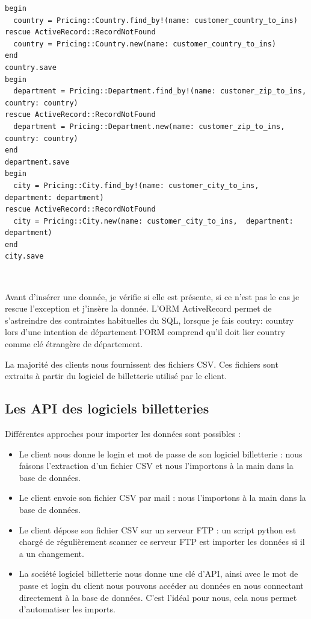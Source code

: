 \lstset{style=customruby}
\begin{lstlisting}
begin
  country = Pricing::Country.find_by!(name: customer_country_to_ins)
rescue ActiveRecord::RecordNotFound 
  country = Pricing::Country.new(name: customer_country_to_ins)
end
country.save
begin
  department = Pricing::Department.find_by!(name: customer_zip_to_ins, country: country)
rescue ActiveRecord::RecordNotFound
  department = Pricing::Department.new(name: customer_zip_to_ins,  country: country)
end
department.save
begin
  city = Pricing::City.find_by!(name: customer_city_to_ins, department: department)
rescue ActiveRecord::RecordNotFound
  city = Pricing::City.new(name: customer_city_to_ins,  department: department)
end
city.save
\end{lstlisting}
\leavevmode \

Avant d'insérer une donnée, je vérifie si elle est présente, si ce n'est pas le cas je rescue l'exception et j'insère la donnée. 
L'ORM ActiveRecord permet de s'astreindre des contraintes habituelles du SQL, lorsque je fais coutry: country lors d'une intention de département l'ORM comprend qu'il doit lier country comme clé étrangère de département.

La majorité des clients nous fournissent des fichiers CSV. Ces fichiers sont extraits à partir du logiciel de billetterie utilisé par le client.


\subsection{Les API des logiciels billetteries}
Différentes approches pour importer les données sont possibles : 
\begin{itemize}
  \item[\textbullet] Le client nous donne le login et mot de passe de son logiciel billetterie : nous faisons l'extraction d'un fichier CSV et nous l'importons à la main dans la base de données. 
  \item[\textbullet] Le client envoie son fichier CSV par mail : nous l'importons à la main dans la base de données.
  \item[\textbullet] Le client dépose son fichier CSV sur un serveur FTP : un script python est chargé de régulièrement scanner ce serveur FTP est importer les données si il a un changement.
  \item[\textbullet] La société logiciel billetterie nous donne une clé d'API, ainsi avec le mot de passe et login du client nous pouvons accéder au données en nous connectant directement à la base de données. C'est l'idéal pour nous, cela nous permet d'automatiser les imports.
\end{itemize}

